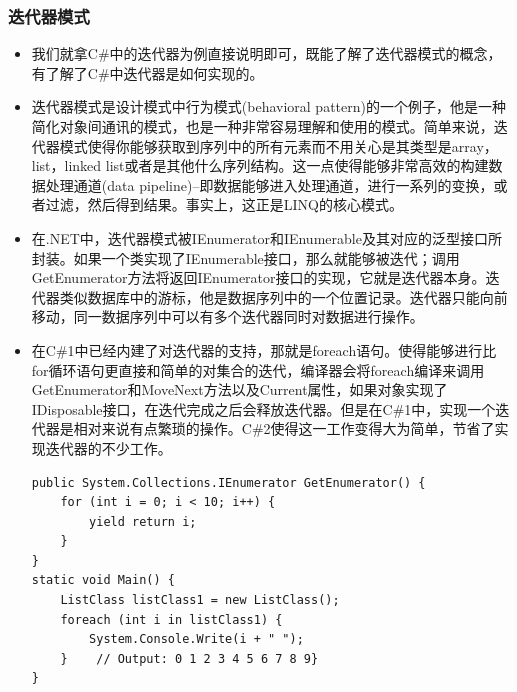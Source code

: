 \documentclass[9pt, b5paper]{article}
\begin{document}
\subsubsection{迭代器模式}
\label{sec:orgf915cf7}
\begin{itemize}
\item 我们就拿C\#中的迭代器为例直接说明即可，既能了解了迭代器模式的概念，有了解了C\#中迭代器是如何实现的。
\item 迭代器模式是设计模式中行为模式(behavioral pattern)的一个例子，他是一种简化对象间通讯的模式，也是一种非常容易理解和使用的模式。简单来说，迭代器模式使得你能够获取到序列中的所有元素而不用关心是其类型是array，list，linked list或者是其他什么序列结构。这一点使得能够非常高效的构建数据处理通道(data pipeline)--即数据能够进入处理通道，进行一系列的变换，或者过滤，然后得到结果。事实上，这正是LINQ的核心模式。
\item 在.NET中，迭代器模式被IEnumerator和IEnumerable及其对应的泛型接口所封装。如果一个类实现了IEnumerable接口，那么就能够被迭代；调用GetEnumerator方法将返回IEnumerator接口的实现，它就是迭代器本身。迭代器类似数据库中的游标，他是数据序列中的一个位置记录。迭代器只能向前移动，同一数据序列中可以有多个迭代器同时对数据进行操作。
\item 在C\#1中已经内建了对迭代器的支持，那就是foreach语句。使得能够进行比for循环语句更直接和简单的对集合的迭代，编译器会将foreach编译来调用GetEnumerator和MoveNext方法以及Current属性，如果对象实现了IDisposable接口，在迭代完成之后会释放迭代器。但是在C\#1中，实现一个迭代器是相对来说有点繁琐的操作。C\#2使得这一工作变得大为简单，节省了实现迭代器的不少工作。
\begin{verbatim}
public System.Collections.IEnumerator GetEnumerator() {
    for (int i = 0; i < 10; i++) {
        yield return i;
    }
}
static void Main() {
    ListClass listClass1 = new ListClass();
    foreach (int i in listClass1) {
        System.Console.Write(i + " ");
    }    // Output: 0 1 2 3 4 5 6 7 8 9}
}
\end{verbatim}
\end{itemize}
\end{document}
